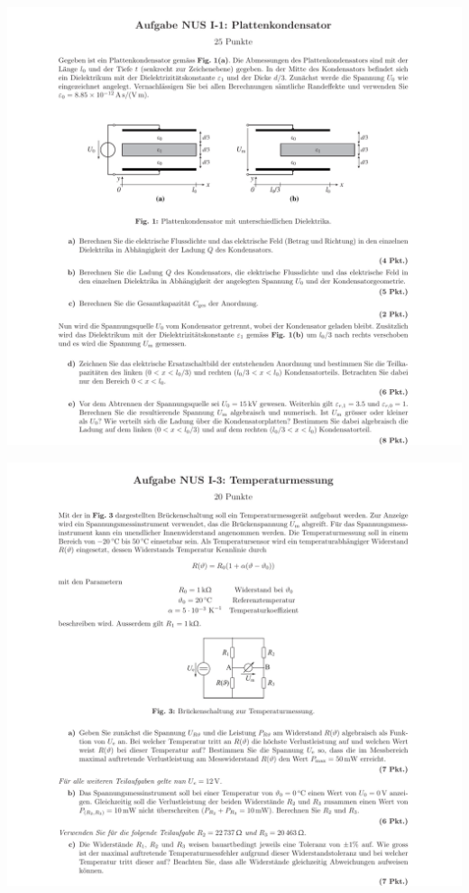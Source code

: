 \documentclass[a4paper, 8pt, landscape]{scrartcl} %
\begin{document}
\begin{multicols}{2}
  \begin{center}
      \includegraphics[width= \columnwidth]{img/efeld2.pdf} \\
  \end{center}
    \vfill \null \columnbreak

  \includegraphics[width=\columnwidth]{img/netzw2.pdf} \\


\end{multicols}
\end{document}
